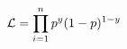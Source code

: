 \documentclass[preview]{standalone}
\begin{document}
\begin{align*}
\special{dvisvgm:raw <g id='unique000'>}\mathcal{L}=\prod^n_{i=1}p^y(1-p)^{1-y}\special{dvisvgm:raw </g>}
\end{align*}
\end{document}
